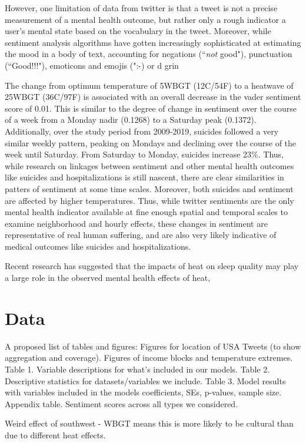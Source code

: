 \documentclass{article}
\begin{document}
However, one limitation of data from twitter is that a tweet is not a precise measurement of a mental health outcome, but rather only a rough indicator a user's mental state based on the vocabulary in the tweet.  Moreover, while sentiment analysis algorithms have gotten increasingly sophisticated at estimating the mood in a body of text, accounting for negations (``\textit{not} good"), punctuation (``Good!!!"), emoticons and emojis (":-) or d grin




  The change from optimum temperature of 5WBGT (12C/54F) to a heatwave of 25WBGT (36C/97F) is associated with an overall decrease in the vader sentiment score of 0.01.  This is similar to the degree of change in sentiment over the course of a week from a Monday nadir (0.1268) to a Saturday peak (0.1372).  Additionally, over the study period from 2009-2019, suicides followed a very similar weekly pattern, peaking on Mondays and declining over the course of the week until Saturday.  From Saturday to Monday, suicides increase 23\%.  Thus, while research on linkages between sentiment and other mental health outcomes like suicides and hospitalizations is still nascent, there are clear similarities in patters of sentiment at some time scales.  Moreover, both suicides and sentiment are affected by higher temperatures.  Thus, while twitter sentiments are the only mental health indicator available at fine enough spatial and temporal scales to examine neighborhood and hourly effects, these changes in sentiment are representative of real human suffering, and are also very likely indicative of medical outcomes like suicides and hospitalizations.

Recent research has suggested that the impacts of heat on sleep quality may play a large role in the observed mental health effects of heat, 
\section{Data}
A proposed list of tables and figures:
Figures for location of USA Tweets (to show aggregation and coverage).
Figures of income blocks and temperature extremes.
Table 1. Variable descriptions for what's included in our models.
Table 2. Descriptive statistics for datasets/variables we include.
Table 3. Model results with variables included in the models coefficients, SEs, p-values, sample size.
Appendix table. Sentiment scores across all types we considered.

Weird effect of southwest - WBGT means this is more likely to be cultural than due to different heat effects.
\end{document}
